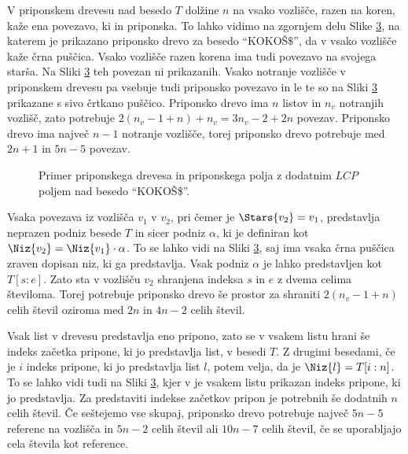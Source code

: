 V priponskem drevesu nad besedo $T$ dolžine $n$ na vsako vozlišče, razen na koren, kaže ena povezavo, ki in priponska. To lahko vidimo na zgornjem delu Slike \ref{fig:SuffuxArray}, na katerem je prikazano priponsko drevo za besedo \enquote{KOKOŠ$\$$}, da v vsako vozlišče kaže črna puščica. Vsako vozlišče razen korena ima tudi povezavo na svojega starša. Na Sliki \ref{fig:SuffuxArray} teh povezan ni prikazanih. Vsako notranje vozlišče v priponskem drevesu pa vsebuje tudi priponsko povezavo in le te so na Sliki \ref{fig:SuffuxArray} prikazane s sivo črtkano puščico. Priponsko drevo ima $n$ listov in $n_v$ notranjih vozlišč, zato potrebuje $2(n_v-1+n)+n_v= 3n_v-2+2n$ povezav. Priponsko drevo ima največ $n-1$ notranje vozlišče, torej priponsko drevo potrebuje med $2n+1$ in $5n -5$ povezav.

\begin{figure}[htb]
    \begin{subfigure}[t]{\linewidth}
        
        
        \centering
        \subcaption*{}
        \label{fig:bSADrevo}
    \end{subfigure}
    \begin{subfigure}[t]{1\linewidth}        
        
        \centering
        \subcaption*{}
        \label{fig:bSAPolje}
    \end{subfigure}
    \caption{Primer priponskega drevesa in priponskega polja z dodatnim $LCP$ poljem nad besedo \enquote{KOKOŠ\$}.} 
    \label{fig:SuffuxArray}
\end{figure}

Vsaka povezava iz vozlišča $v_1$ v $v_2$, pri čemer je $\Stars{v_2}=v_1$, predstavlja neprazen podniz besede $T$ in sicer podniz $\alpha$, ki je definiran kot $\Niz{v_2}=\Niz{v_1}\cdot\alpha$. To se lahko vidi na Sliki \ref{fig:SuffuxArray}, saj ima vsaka črna puščica zraven dopisan niz, ki ga predstavlja. Vsak podniz $\alpha$ je lahko predstavljen kot $T[s:e]$. Zato sta v vozlišču $v_2$ shranjena indeksa $s$ in $e$ z dvema celima številoma. Torej potrebuje priponsko drevo še prostor za shraniti $2(n_v-1+n)$ celih števil oziroma med $2n$ in $4n-2$ celih števil.

Vsak list v drevesu predstavlja eno pripono, zato se v vsakem listu hrani še indeks začetka pripone, ki jo predstavlja list, v besedi $T$. Z drugimi besedami, če je $i$ indeks pripone, ki jo predstavlja list $l$, potem velja, da je $\Niz{l}=T[i:n]$. To se lahko vidi tudi na Sliki \ref{fig:SuffuxArray}, kjer v je vsakem listu prikazan indeks pripone, ki jo predstavlja. Za predstaviti indekse začetkov pripon je potrebnih še dodatnih $n$ celih števil. Če seštejemo vse skupaj, priponsko drevo potrebuje največ $5n-5$ referenc na vozlišča in $5n-2$ celih števil ali $10n-7$ celih števil, če se uporabljajo cela števila kot reference.

